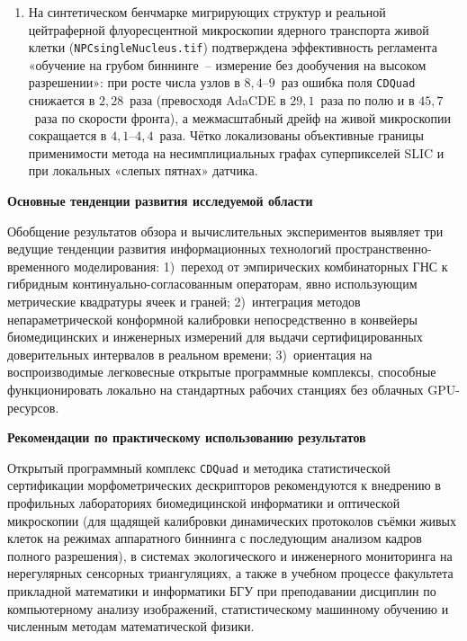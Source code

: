 \begin{enumerate}
    \item На синтетическом бенчмарке мигрирующих структур и реальной цейтраферной флуоресцентной микроскопии ядерного транспорта живой клетки (\texttt{NPCsingleNucleus.tif}) подтверждена эффективность регламента «обучение на грубом биннинге~-- измерение без дообучения на высоком разрешении»: при росте числа узлов в $8{,}4\text{--}9$~раз ошибка поля \texttt{CDQuad} снижается в $2{,}28$~раза (превосходя AdaCDE в $29{,}1$~раза по полю и в $45{,}7$~раза по скорости фронта), а межмасштабный дрейф на живой микроскопии сокращается в $4{,}1\text{--}4{,}4$~раза. Чётко локализованы объективные границы применимости метода на несимплициальных графах суперпикселей SLIC и при локальных «слепых пятнах» датчика.
\end{enumerate}

\vspace{0.35cm}
\textbf{Основные тенденции развития исследуемой области}

Обобщение результатов обзора и вычислительных экспериментов выявляет три ведущие тенденции развития информационных технологий пространственно-временного моделирования: 1)~переход от эмпирических комбинаторных ГНС к гибридным континуально-согласованным операторам, явно использующим метрические квадратуры ячеек и граней; 2)~интеграция методов непараметрической конформной калибровки непосредственно в конвейеры биомедицинских и инженерных измерений для выдачи сертифицированных доверительных интервалов в реальном времени; 3)~ориентация на воспроизводимые легковесные открытые программные комплексы, способные функционировать локально на стандартных рабочих станциях без облачных GPU-ресурсов.

\vspace{0.35cm}
\textbf{Рекомендации по практическому использованию результатов}

Открытый программный комплекс \texttt{CDQuad} и методика статистической сертификации морфометрических дескрипторов рекомендуются к внедрению в профильных лабораториях биомедицинской информатики и оптической микроскопии (для щадящей калибровки динамических протоколов съёмки живых клеток на режимах аппаратного биннинга с последующим анализом кадров полного разрешения), в системах экологического и инженерного мониторинга на нерегулярных сенсорных триангуляциях, а также в учебном процессе факультета прикладной математики и информатики БГУ при преподавании дисциплин по компьютерному анализу изображений, статистическому машинному обучению и численным методам математической физики.

\newpage
